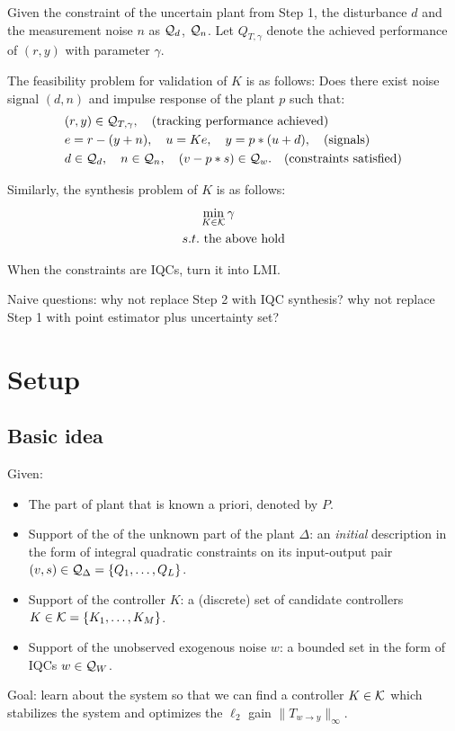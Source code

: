 \documentclass[11pt, onecolumn]{article}
\begin{document}
Given the constraint of the uncertain plant from Step 1, the disturbance $d$ and the measurement
noise $n$ as $\mathcal Q_d$, $\mathcal Q_n$. Let $Q_{T,\gamma}$ denote the achieved performance of $(r,y)$
with parameter $\gamma$.

The feasibility problem for validation of $K$ is as follows: Does there exist noise signal $(d, n)$
and impulse response of the plant $p$ such that:
\begin{align*}
  & (r,y)\in\mathcal Q_{T,\gamma}, \quad\text{(tracking performance achieved)}
  \\
  & e = r-(y+n), \quad u = K e, \quad y = p * (u+d),  \quad\text{(signals)}
  \\
  & d\in\mathcal Q_d, \quad n\in\mathcal Q_n,  \quad (v-p*s )\in\mathcal Q_w. \quad\text{(constraints satisfied)}
\end{align*}

Similarly, the synthesis problem of $K$ is as follows:
\begin{align*}
  &\min_{K\in\mathcal K} \gamma
  \\
  s.t.& \text{ the above hold}
\end{align*}

When the constraints are IQCs, turn it into LMI.


Naive questions: why not replace Step 2 with IQC synthesis? why not replace Step 1 with point
estimator plus uncertainty set?

\newpage



\section{Setup}

\subsection{Basic idea}

Given:
\begin{itemize}
\item The part of plant that is known a priori, denoted by $P$.
\item Support of the of the unknown part of the plant $\Delta$: an {\em initial} description in the
  form of integral quadratic constraints on its input-output pair $(v,s)\in \mathcal Q_\Delta = \{Q_1,\dots, Q_L\}$.
\item Support of the controller $K$: a (discrete) set of candidate controllers $K \in \mathcal K = \{K_1,\dots,
  K_M\}$.
\item Support of the unobserved exogenous noise $w$: a bounded set in the form of IQCs $w\in \mathcal
  Q_{W}$.
\end{itemize}
Goal: learn about the system so that we can find a controller $K\in\mathcal K$ which stabilizes the
system and optimizes the $\ell_2$ gain $\|T_{w\to y}\|_{\infty}$.
\end{document}
